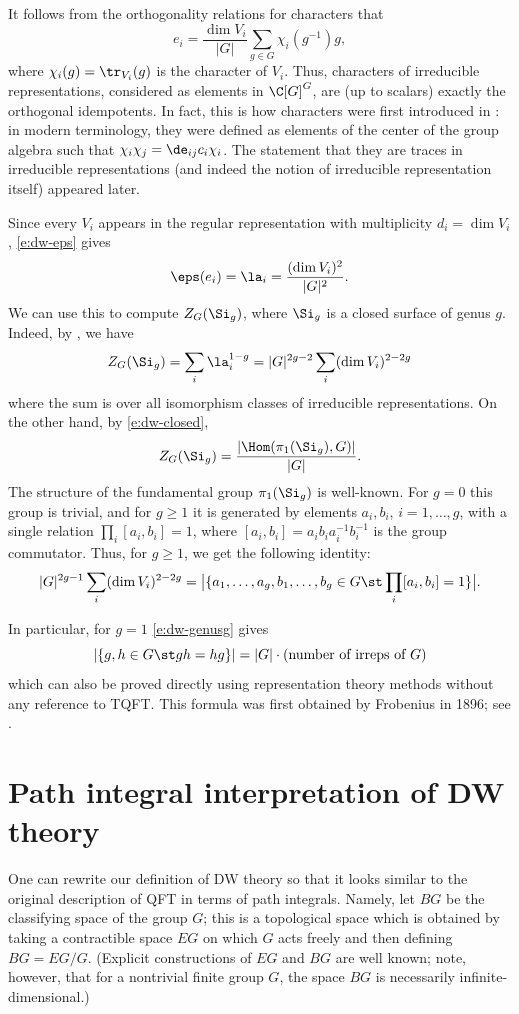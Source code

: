 \begin{remark}\label{r:characters}
  It follows from the orthogonality relations for characters that
  $$
    e_i =\frac{\dim V_i}{|G|} \sum_{g\in G}\chi_i(g^{-1})g,
  $$
  where $\chi_i(g)=\tr_{V_i}(g)$ is the character of $V_i$. Thus, characters of
  irreducible representations, considered as elements in $\C[G]^G$, are (up to
  scalars) exactly the orthogonal idempotents. In fact, this is how characters
  were first introduced in \cite{frobenius-characters}: in modern terminology,
  they were defined as elements of the center of the group algebra such that
  $\chi_i\chi_j = \de_{ij}c_i\chi_i$. The statement that they are traces in
  irreducible representations (and indeed the notion of irreducible
  representation itself) appeared later.
\end{remark}

Since every $V_i$ appears in the regular representation with
multiplicity $d_i=\dim V_i$, \eqref{e:dw-eps} gives
$$
  \eps(e_i) = \la_i = \frac{(\dim V_i)^2}{|G|^2}.
$$
We can use this to compute $Z_G(\Si_g)$, where $\Si_g$ is a closed
surface of genus $g$. Indeed, by , we have
$$
  Z_G(\Si_g)= \sum_i \la_i^{1-g} = |G|^{2g-2} \sum_i (\dim V_i)^{2-2g}
$$
where the sum is over all isomorphism classes of irreducible representations.
On the other hand, by \eqref{e:dw-closed},
$$
  Z_G(\Si_g) =\frac{|\Hom(\pi_1(\Si_g), G)|}{|G|}.
$$
The structure of the fundamental group $\pi_1(\Si_g)$ is well-known. For
$g=0$ this group is trivial, and for $g\ge 1$ it is generated by elements
$a_i, b_i$, $i=1, \dots, g$, with a single relation $\prod_i [a_i,b_i]=1$,
where $[a_i,b_i] = a_ib_ia_i^{-1}b_i^{-1}$ is the group commutator. Thus,
for $g\ge 1$, we get the following identity:
\begin{equation}\label{e:dw-genusg}
  |G|^{2g-1} \sum_i (\dim V_i)^{2-2g}
  =\bigl|
    \{a_1, \dots, a_g, b_1, \dots, b_g\in G\st \prod_i [a_i,b_i]=1\}
    \bigr|.
\end{equation}

In particular, for $g=1$ \eqref{e:dw-genusg} gives
$$
  |\{g,h\in G\st gh=hg\}|=|G|\cdot (\text{number of irreps of $G$})
$$
which can also be proved directly using representation theory methods without
any reference to TQFT. This formula was first obtained by Frobenius in 1896;
see \cite{frobenius-characters}.

\section{Path integral interpretation of DW theory}\label{s:DW-path-integral}
One can rewrite our definition of DW theory so that it looks similar to the
original description of QFT in terms of path integrals. Namely, let $BG$
be the classifying space of the group $G$; this is a topological space which
is obtained by taking a contractible space $EG$ on which $G$ acts freely and
then defining $BG=EG/G$. (Explicit constructions of $EG$ and $BG$ are
well known; note, however, that for a nontrivial finite group $G$, the space
$BG$ is necessarily infinite-dimensional.)

